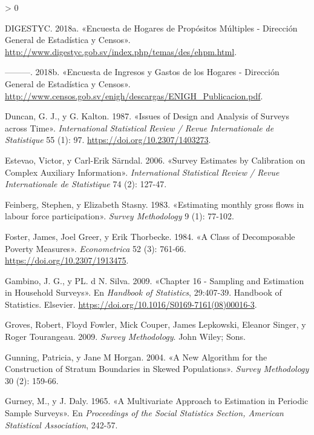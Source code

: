 \documentclass[
  12pt,
  spanish,
]{book}
\newlength{\cslhangindent}
\newenvironment{CSLReferences}[2] %
 {%
  \setlength{\parindent}{0pt}
  \ifodd #1 \everypar{\setlength{\hangindent}{\cslhangindent}}\ignorespaces\fi
  \ifnum #2 > 0
  \setlength{\parskip}{#2\baselineskip}
  \fi
 }%
 {}
\begin{document}
\begin{CSLReferences}{1}{0}
\leavevmode\hypertarget{ref-DIGESTYC-SV}{}%
DIGESTYC. 2018a. {«Encuesta de Hogares de Propósitos Múltiples - Dirección General de Estadística y Censos»}. \url{http://www.digestyc.gob.sv/index.php/temas/des/ehpm.html}.

\leavevmode\hypertarget{ref-DIGESTYC2-SV}{}%
---------. 2018b. {«Encuesta de Ingresos y Gastos de los Hogares - Dirección General de Estadística y Censos»}. \url{http://www.censos.gob.sv/enigh/descargas/ENIGH_Publicacion.pdf}.

\leavevmode\hypertarget{ref-Duncan_Kalton_1987}{}%
Duncan, G. J., y G. Kalton. 1987. {«Issues of Design and Analysis of Surveys across Time»}. \emph{International Statistical Review / Revue Internationale de Statistique} 55 (1): 97. \url{https://doi.org/10.2307/1403273}.

\leavevmode\hypertarget{ref-Estevao_Sarndal_2006}{}%
Estevao, Victor, y Carl-Erik Särndal. 2006. {«Survey Estimates by Calibration on Complex Auxiliary Information»}. \emph{International Statistical Review / Revue Internationale de Statistique} 74 (2): 127-47.

\leavevmode\hypertarget{ref-Feinberg_Stasny_1983}{}%
Feinberg, Stephen, y Elizabeth Stasny. 1983. {«Estimating monthly gross flows in labour force participation»}. \emph{Survey Methodology} 9 (1): 77-102.

\leavevmode\hypertarget{ref-Foster_Greer_Thorbecke_1984}{}%
Foster, James, Joel Greer, y Erik Thorbecke. 1984. {«A Class of Decomposable Poverty Measures»}. \emph{Econometrica} 52 (3): 761-66. \url{https://doi.org/10.2307/1913475}.

\leavevmode\hypertarget{ref-Gambino_Silva_2009}{}%
Gambino, J. G., y PL. d N. Silva. 2009. {«Chapter 16 - Sampling and Estimation in Household Surveys»}. En \emph{Handbook of Statistics}, 29:407-39. Handbook of Statistics. Elsevier. \url{https://doi.org/10.1016/S0169-7161(08)00016-3}.

\leavevmode\hypertarget{ref-Groves_Fowler_Couper_Lepkowski_Singer_Tourangeau_2009}{}%
Groves, Robert, Floyd Fowler, Mick Couper, James Lepkowski, Eleanor Singer, y Roger Tourangeau. 2009. \emph{Survey Methodology}. John Wiley; Sons.

\leavevmode\hypertarget{ref-Gunning_Horgan_2004}{}%
Gunning, Patricia, y Jane M Horgan. 2004. {«A New Algorithm for the Construction of Stratum Boundaries in Skewed Populations»}. \emph{Survey Methodology} 30 (2): 159-66.

\leavevmode\hypertarget{ref-Gurney_Daly_1965}{}%
Gurney, M., y J. Daly. 1965. {«A Multivariate Approach to Estimation in Periodic Sample Surveys»}. En \emph{Proceedings of the Social Statistics Section, American Statistical Association}, 242-57.


\end{CSLReferences}
\end{document}

